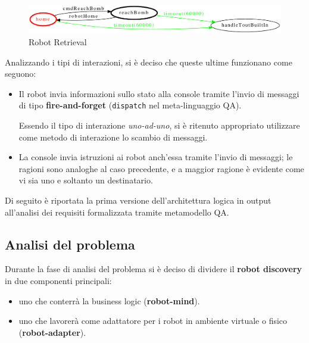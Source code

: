 \begin{figure}[H]
  \centering
  \includegraphics[width=\textwidth]{res/sprint1/requirements/robotretrieval}
  \caption{Robot Retrieval}%
  \label{fig:sp1:req:robotretrieval}
\end{figure}

\clearpage

Analizzando i tipi di interazioni, si è deciso che queste ultime funzionano come seguono:

\begin{itemize}
  \item
    Il robot invia informazioni sullo stato alla console tramite l'invio di messaggi di tipo \textbf{fire-and-forget}
    (\texttt{dispatch} nel meta-linguaggio QA).

    Essendo il tipo di interazione \textit{uno-ad-uno}, si è ritenuto appropriato utilizzare come metodo di interazione lo scambio di messaggi.

  \item
    La console invia istruzioni ai robot anch'essa tramite l'invio di messaggi;
    le ragioni sono analoghe al caso precedente,
    e a maggior ragione è evidente come vi sia uno e soltanto un destinatario.

\end{itemize}

Di seguito è riportata la prima versione dell'architettura logica in output all'analisi dei requisiti formalizzata tramite metamodello QA\@.



\subsection{Analisi del problema}

Durante la fase di analisi del problema si è deciso di dividere il \textbf{robot discovery} in due componenti principali:

\begin{itemize}
  \item uno che conterrà la business logic (\textbf{robot-mind}).
  \item uno che lavorerà come adattatore per i robot in ambiente virtuale o fisico (\textbf{robot-adapter}).
\end{itemize}

